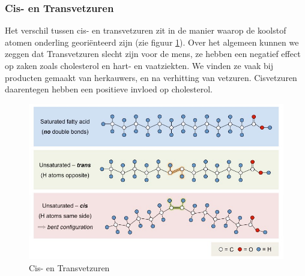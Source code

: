 \documentclass[a4paper,kul]{kulakarticle} %
\begin{document}
\subsubsection{Cis- en Transvetzuren}
Het verschil tussen cis- en transvetzuren zit in de manier waarop de koolstof atomen onderling georiënteerd zijn (zie figuur \ref{fig:cistransvz}). Over het algemeen kunnen we zeggen dat Transvetzuren slecht zijn voor de mens, ze hebben een negatief effect op zaken zoals cholesterol en hart- en vaatziekten. We vinden ze vaak bij producten gemaakt van herkauwers, en na verhitting van vetzuren. Cisvetzuren daarentegen hebben een positieve invloed op cholesterol.
\begin{figure}[h]
	\centering
	\includegraphics[width=0.7\linewidth]{CisTransVZ}
	\caption[Cis en Trans]{Cis- en Transvetzuren}
	\label{fig:cistransvz}
\end{figure}
\newpage
\end{document}
